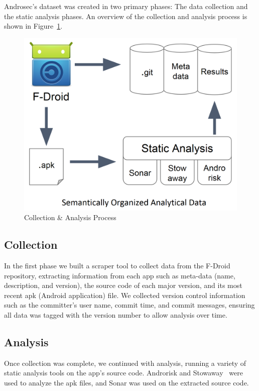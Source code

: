 Androsec's dataset was created in two primary phases: The data collection and the static analysis phases. An overview of the collection and analysis process is shown in Figure~\ref{fig:ap}.

\begin{figure}[tbph]
\centering
\vspace{-0.2cm}
\includegraphics[scale=.18]{./images/process.png}


\caption{Collection \& Analysis Process}
\vspace{-0.2cm}
\label{fig:ap}
\end{figure}

\subsection{Collection}
In the first phase we built a scraper tool to collect data from the F-Droid repository, extracting information from each app such as meta-data (name, description, and version), the source code of each major version, and its most recent apk (Android application) file. We collected version control information such as the committer's user name, commit time, and commit messages, ensuring all data was tagged with the version number to allow analysis over time. 


\subsection{Analysis}
Once collection was complete, we continued with analysis, running a variety of static analysis tools on the app's source code. Androrisk and Stowaway~\cite{Felt:2011:APD:2046707.2046779} were used to analyze the apk files, and Sonar was used on the extracted source code.\\

